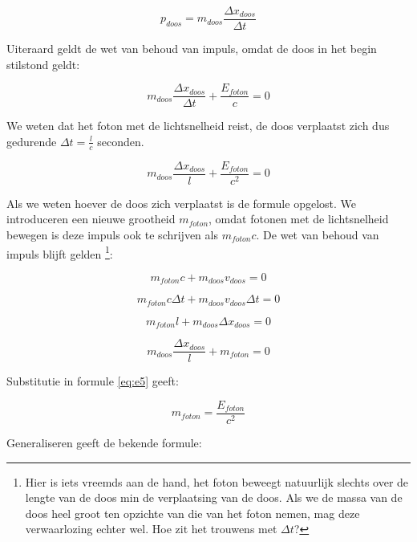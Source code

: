 \begin{equation}
p_{doos}=m_{doos}\frac{\Delta x_{doos}}{\Delta t}
\end{equation}


Uiteraard geldt de wet van behoud van impuls, omdat de doos in het
begin stilstond geldt:

\begin{equation}
m_{doos}\frac{\Delta x_{doos}}{\Delta t}+\frac{E_{foton}}{c}=0
\end{equation}


We weten dat het foton met de lichtsnelheid reist, de doos verplaatst
zich dus gedurende $\Delta t=\frac{l}{c}$ seconden.

\begin{equation}
m_{doos}\frac{\Delta x_{doos}}{l}+\frac{E_{foton}}{c^{2}}=0\label{eq:e5}
\end{equation}


Als we weten hoever de doos zich verplaatst is de formule opgelost. We
introduceren een nieuwe grootheid $m_{foton}$, omdat fotonen met de
lichtsnelheid bewegen is deze impuls ook te schrijven als $m_{foton}c$.
De wet van behoud van impuls blijft gelden \footnote{Hier is iets
vreemds aan de hand, het foton beweegt natuurlijk slechts over de lengte
van de doos min de verplaatsing van de doos. Als we de massa van de doos
heel groot ten opzichte van die van het foton nemen, mag deze
verwaarlozing echter wel. Hoe zit het trouwens met $\Delta t$?}:

\begin{equation}
m_{foton}c+m_{doos}v_{doos}=0
\end{equation}


\begin{equation}
m_{foton}c\Delta t+m_{doos}v_{doos}\Delta t=0
\end{equation}


\begin{equation}
m_{foton}l+m_{doos}\Delta x_{doos}=0
\end{equation}


\begin{equation}
m_{doos}\frac{\Delta x_{doos}}{l}+m_{foton}=0
\end{equation}


Substitutie in formule \ref{eq:e5} geeft:

\begin{equation}
m_{foton}=\frac{E_{foton}}{c^{2}}
\end{equation}


Generaliseren geeft de bekende formule:

